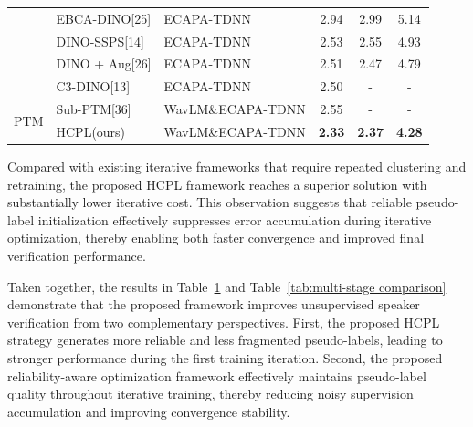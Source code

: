\documentclass[lettersize,journal]{IEEEtran}
\begin{document}
\begin{table}[t]
\begin{tabular}{l l l  c c c}
        &EBCA-DINO[25]&ECAPA-TDNN& 2.94 &2.99  &  5.14  \\
        &DINO-SSPS[14]&ECAPA-TDNN& 2.53 &2.55  &  4.93  \\
        &DINO + Aug[26]&ECAPA-TDNN& 2.51 &2.47  &  4.79  \\
        &C3-DINO[13]&ECAPA-TDNN& 2.50& - &-    \\
        \hline
        \multirow{2}{*}{PTM}
        &Sub-PTM[36]&WavLM\&ECAPA-TDNN& 2.55& - &-    \\
        &HCPL(ours) & WavLM\&ECAPA-TDNN  & \textbf{2.33} & \textbf{2.37} & \textbf{4.28}   \\
        \hline
    \end{tabular}
    \label{tab:single-stage comparison}
\end{table}
\FloatBarrier




Compared with existing iterative frameworks that require repeated clustering and retraining, the proposed HCPL framework reaches a superior solution with substantially lower iterative cost. This observation suggests that reliable pseudo-label initialization effectively suppresses error accumulation during iterative optimization, thereby enabling both faster convergence and improved final verification performance.

Taken together, the results in Table~\ref{tab:single-stage comparison} and Table~\ref{tab:multi-stage comparison} demonstrate that the proposed framework improves unsupervised speaker verification from two complementary perspectives. First, the proposed HCPL strategy generates more reliable and less fragmented pseudo-labels, leading to stronger performance during the first training iteration. Second, the proposed reliability-aware optimization framework effectively maintains pseudo-label quality throughout iterative training, thereby reducing noisy supervision accumulation and improving convergence stability.
\end{document}
